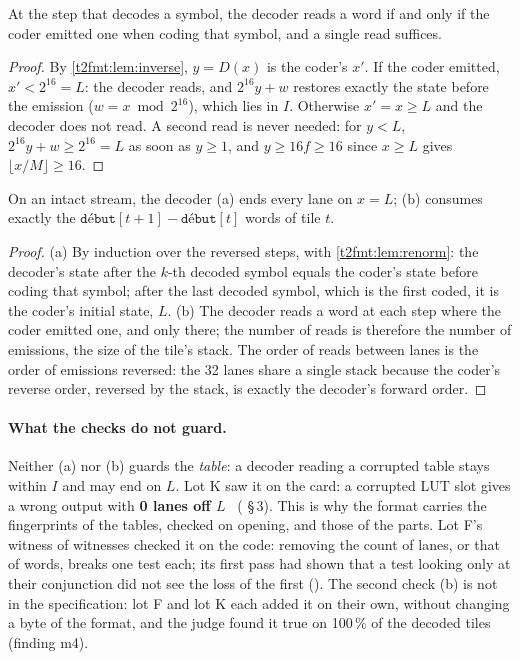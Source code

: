 \begin{lemme}\label{t2fmt:lem:renorm}
At the step that decodes a symbol, the decoder reads a word if and only if the coder emitted one when coding that symbol, and a single read suffices.
\end{lemme}
\begin{proof}
By \cref{t2fmt:lem:inverse}, $y = D(x)$ is the coder's $x'$. If the coder emitted, $x' < 2^{16} = L$: the decoder reads, and $2^{16} y + w$ restores exactly the state before the emission ($w = x \bmod 2^{16}$), which lies in $I$. Otherwise $x' = x \ge L$ and the decoder does not read. A second read is never needed: for $y < L$, $2^{16} y + w \ge 2^{16} = L$ as soon as $y \ge 1$, and $y \ge 16 f \ge 16$ since $x \ge L$ gives $\lfloor x/M \rfloor \ge 16$.
\end{proof}

\begin{proposition}\label{t2fmt:prop:controles}
On an intact stream, the decoder (a) ends every lane on $x = L$; (b) consumes exactly the $\texttt{début}[t+1] - \texttt{début}[t]$ words of tile $t$.
\end{proposition}
\begin{proof}
(a) By induction over the reversed steps, with \cref{t2fmt:lem:renorm}: the decoder's state after the $k$-th decoded symbol equals the coder's state before coding that symbol; after the last decoded symbol, which is the first coded, it is the coder's initial state, $L$.
(b) The decoder reads a word at each step where the coder emitted one, and only there; the number of reads is therefore the number of emissions, the size of the tile's stack. The order of reads between lanes is the order of emissions reversed: the 32 lanes share a single stack because the coder's reverse order, reversed by the stack, is exactly the decoder's forward order.
\end{proof}

\paragraph{What the checks do not guard.} Neither (a) nor (b) guards the \emph{table}: a decoder reading a corrupted table stays within $I$ and may end on $L$. Lot K saw it on the card: a corrupted LUT slot gives a wrong output with \textbf{0 lanes off $L$} \mes~( §\,3). This is why the format carries the fingerprints of the tables, checked on opening, and those of the parts. Lot F's witness of witnesses checked it on the code: removing the count of lanes, or that of words, breaks one test each; its first pass had shown that a test looking only at their conjunction did not see the loss of the first (). The second check (b) is not in the specification: lot F and lot K each added it on their own, without changing a byte of the format, and the judge found it true on 100\,\% of the decoded tiles (finding m4).

